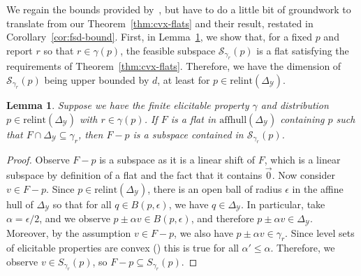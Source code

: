 \documentclass{article}
\newcommand{\Comments}{1}
\newcommand{\mynote}[2]{\ifnum\Comments=1\textcolor{#1}{#2}\fi}
\newcommand{\raf}[1]{\mynote{green}{[RF: #1]}}
\newcommand{\simplex}{\Delta_\Y}
\newcommand{\relint}[1]{\mathrm{relint}(#1)}
\newcommand{\affhull}{\mathrm{affhull}}
\renewcommand{\S}{\mathcal{S}}
\newcommand{\Y}{\mathcal{Y}}
\newtheorem{lemma}{Lemma}
\begin{document}
We regain the bounds provided by~\cite[Theorem 16]{ramaswamy2016convex}, but have to do a little bit of groundwork to translate from our Theorem~\ref{thm:cvx-flats} and their result, restated in Corollary~\ref{cor:fsd-bound}.
First, in Lemma~\ref{lem:feas-sub-is-a-flat}, we show that, for a fixed $p$ and report $r$ so that $r \in \gamma(p)$, the feasible subspace $\S_{\gamma_r}(p)$ is a flat satisfying the requirements of Theorem~\ref{thm:cvx-flats}.
Therefore, we have the dimension of $\S_{\gamma_r}(p)$ being upper bounded by $d$, at least for $p \in \relint{\simplex}$. 
\begin{lemma}\label{lem:feas-sub-is-a-flat}
	Suppose we have the finite elicitable property $\gamma$ and distribution $p \in \relint{\simplex}$ with $r \in \gamma(p)$.
	If $F$ is a flat in $\affhull(\simplex)$ containing $p$ such that $F \cap \simplex \subseteq \gamma_r$, then $F - p$ is a subspace contained in $\S_{\gamma_r}(p)$.
\end{lemma}
\begin{proof}
  Observe $F-p$ is a subspace as it is a linear shift of $F$, which is a linear subspace by definition of a flat and the fact that it contains $\vec 0$.
  Now consider $v \in F - p$.
  Since $p \in \relint{\simplex}$, there is an open ball of radius $\epsilon$ in the affine hull of $\simplex$ so that for all $q \in B(p, \epsilon)$, we have $q \in \simplex$.
  In particular, take $\alpha = \epsilon / 2$, and we observe $p \pm \alpha v \in B(p, \epsilon)$, and therefore $p \pm \alpha v \in \simplex$.
  Moreover, by the assumption $v \in F - p$, we also have $p \pm \alpha v \in \gamma_r$. 
  Since level sets of elicitable properties are convex (\cite{lambert2009eliciting}) this is true for all $\alpha' \leq \alpha$.
  Therefore, we observe $v \in S_{\gamma_r}(p)$, so $F-p \subseteq S_{\gamma_r}(p)$.
%  
\end{proof}
\end{document}
